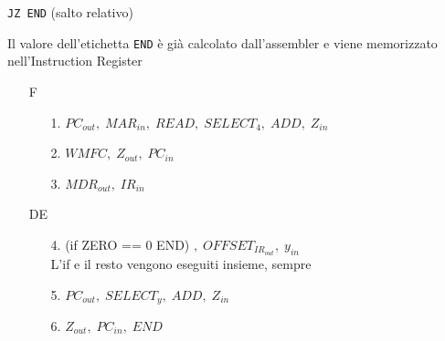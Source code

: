 \documentclass[a4paper]{article}
\theoremstyle{break}
\theoremstyle{break}
\theoremstyle{break}
\theoremstyle{break}
\begin{document}
\begin{example}
	\begin{center}
		\texttt{JZ END} \quad (salto relativo)
	\end{center}

	\noindent Il valore dell'etichetta \texttt{END} è già calcolato dall'assembler e viene memorizzato
	nell'Instruction Register
	\begin{enumerate}
		\item [F]
		      \begin{enumerate}
			      \item[1.] \( PC_{out},\; MAR_{in},\; READ ,\; SELECT_4,\; ADD,\; Z_{in}\)
			      \item[2.] \( WMFC,\; Z_{out},\; PC_{in}\)
			      \item[3.] \( MDR_{out},\; IR_{in} \)
		      \end{enumerate}
		\item[DE]
		      \begin{enumerate}
			      \item[4.] (if ZERO == 0 END) \(,\; OFFSET_{IR_{out}},\; y_{in} \)\\
			            L'if e il resto vengono eseguiti insieme, sempre
			      \item[5.] \( PC_{out},\; SELECT_{y},\; ADD,\; Z_{in} \)
			      \item[6.] \( Z_{out},\; PC_{in},\; END \)
		      \end{enumerate}
	\end{enumerate}
\end{example}
\end{document}

